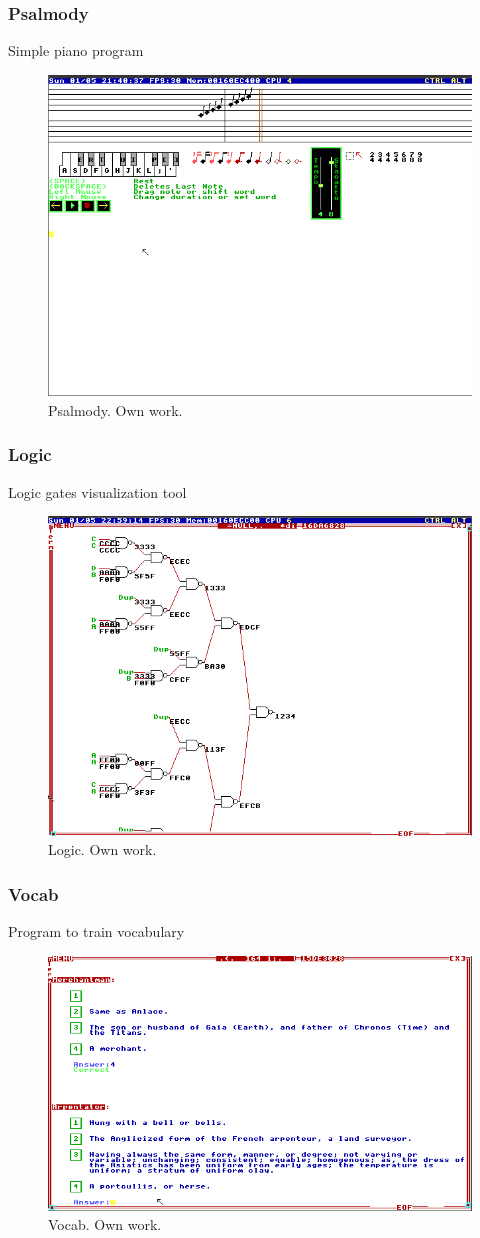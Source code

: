 \documentclass{beamer}
\begin{document}
	\begin{frame}
		\frametitle{Psalmody}
		Simple piano program
		\begin{figure}
			\centering
			\includegraphics[width=0.6\linewidth]{images/psalmody.png}
			\caption{Psalmody. Own work.}
			\label{fig:psalmody}
		\end{figure}
	\end{frame}

	\begin{frame}
		\frametitle{Logic}
		Logic gates visualization tool
		\begin{figure}
			\centering
			\includegraphics[width=0.6\linewidth]{images/logic.png}
			\caption{Logic. Own work.}
			\label{fig:logic}
		\end{figure}
	\end{frame}

	\begin{frame}
		\frametitle{Vocab}
		Program to train vocabulary
		\begin{figure}
			\centering
			\includegraphics[width=0.6\linewidth]{images/vocab.png}
			\caption{Vocab. Own work.}
			\label{fig:vocab}
		\end{figure}
	\end{frame}
\end{document}
